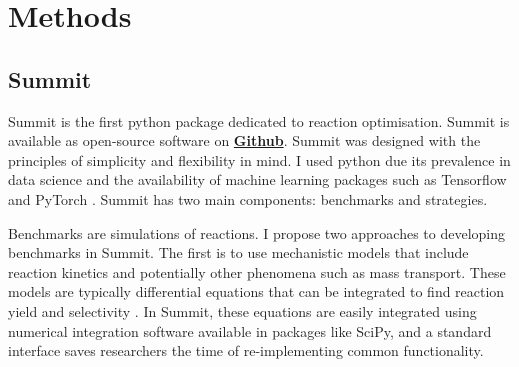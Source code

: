 

\section{Methods}

\subsection{Summit}
Summit is the first python package dedicated to reaction optimisation. Summit is available as open-source software on \textbf{\href{https://github.com/sustainable-processes/summit}{Github}}.  Summit was designed with the principles of simplicity and  flexibility in mind. I used python due its prevalence in data science and the availability of machine learning packages such as Tensorflow \cite{tensorflow2015} and PyTorch \cite{Paszke2019}. Summit has two main components: benchmarks and strategies.
    
Benchmarks are simulations of reactions. I propose two approaches to developing benchmarks in Summit. The first is to use mechanistic models that include reaction kinetics and potentially other phenomena such as mass transport. These models are typically differential equations that can be integrated to find reaction yield and selectivity \cite{Reizman2015b, Baumgartner2018}. In Summit, these equations are easily integrated using numerical integration software available in packages like SciPy, \cite{2020SciPy-NMeth} and a standard interface saves researchers the time of re-implementing common functionality. 

